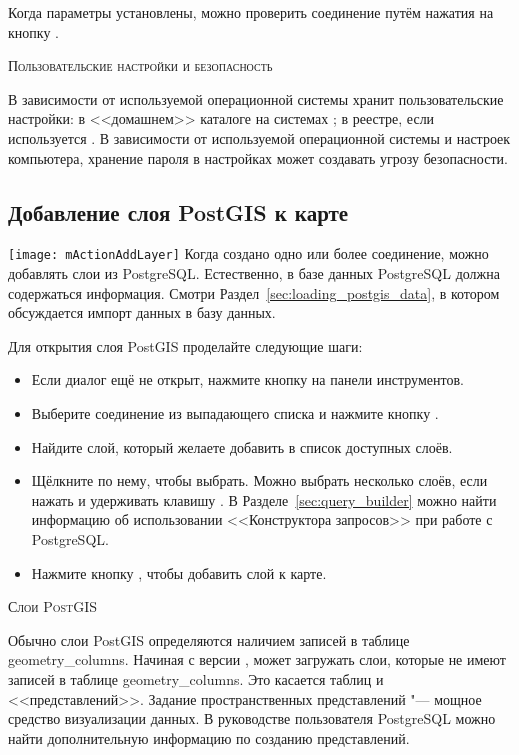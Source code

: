 Когда параметры установлены, можно проверить соединение путём нажатия
на кнопку  .

\begin{Tip}\caption{\textsc{\qg Пользовательские настройки и безопасность}}
В зависимости от используемой операционной системы \qg хранит
пользовательские настройки: в <<домашнем>> каталоге на \nix системах
; в реестре, если используется \win. В зависимости
от используемой операционной системы и настроек компьютера, хранение пароля
в настройках \qg может создавать угрозу безопасности.
\end{Tip}

\subsection{Добавление слоя PostGIS к карте}

\texttt{[image: mActionAddLayer]} Когда создано одно или
более соединение, можно добавлять слои из PostgreSQL. Естественно, в базе
данных PostgreSQL должна содержаться информация. Смотри
Раздел~\ref{sec:loading_postgis_data}, в котором обсуждается импорт данных
в базу данных.

Для открытия слоя PostGIS проделайте следующие шаги:

\begin{itemize}[label=--]
\item Если диалог  ещё не открыт, нажмите
кнопку  на панели
инструментов.
\item Выберите соединение из выпадающего списка и нажмите кнопку
.
\item Найдите слой, который желаете добавить в список доступных слоёв.
\item Щёлкните по нему, чтобы выбрать. Можно выбрать несколько слоёв,
если нажать и удерживать клавишу . В
Разделе~\ref{sec:query_builder} можно найти информацию об использовании
<<Конструктора запросов>> при работе с PostgreSQL.
\item Нажмите кнопку , чтобы добавить слой к карте.
\end{itemize}

\begin{Tip}\caption{\textsc{Слои PostGIS}}
Обычно слои PostGIS определяются наличием записей в таблице
geometry\_columns. Начиная с версии \OLD %
, \qg может загружать слои, которые не имеют записей в таблице
geometry\_columns. Это касается таблиц и <<представлений>>. %
Задание пространственных представлений "--- мощное средство визуализации данных.
В руководстве пользователя PostgreSQL можно найти дополнительную информацию
по созданию представлений.
\end{Tip}

